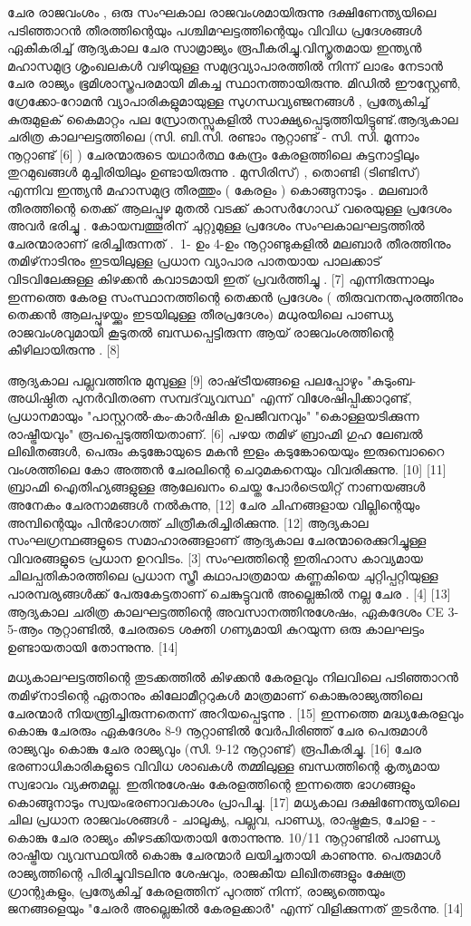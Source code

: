 \documentclass[a4paper,12pt,oneside,final]{article}
\begin{document}
ചേര രാജവംശം , ഒരു സംഘകാല രാജവംശമായിരുന്നു ദക്ഷിണേന്ത്യയിലെ പടിഞ്ഞാറൻ തീരത്തിന്റെയും പശ്ചിമഘട്ടത്തിന്റെയും വിവിധ പ്രദേശങ്ങൾ ഏകീകരിച്ച് ആദ്യകാല ചേര സാമ്രാജ്യം രൂപീകരിച്ചു.വിസ്തൃതമായ ഇന്ത്യൻ മഹാസമുദ്ര ശൃംഖലകൾ വഴിയുള്ള സമുദ്രവ്യാപാരത്തിൽ നിന്ന് ലാഭം നേടാൻ ചേര രാജ്യം ഭൂമിശാസ്ത്രപരമായി മികച്ച സ്ഥാനത്തായിരുന്നു. മിഡിൽ ഈസ്റ്റേൺ, ഗ്രേക്കോ-റോമൻ വ്യാപാരികളുമായുള്ള സുഗന്ധവ്യഞ്ജനങ്ങൾ , പ്രത്യേകിച്ച് കുരുമുളക് കൈമാറ്റം പല സ്രോതസ്സുകളിൽ സാക്ഷ്യപ്പെടുത്തിയിട്ടുണ്ട്.ആദ്യകാല ചരിത്ര കാലഘട്ടത്തിലെ (സി. ബി.സി. രണ്ടാം നൂറ്റാണ്ട് - സി. സി. മൂന്നാം നൂറ്റാണ്ട് [6] ) ചേരന്മാരുടെ യഥാർത്ഥ കേന്ദ്രം കേരളത്തിലെ കുട്ടനാട്ടിലും തുറമുഖങ്ങൾ മുച്ചിരിയിലും ഉണ്ടായിരുന്നു . മുസിരിസ്) , തൊണ്ടി (ടിണ്ടിസ്) എന്നിവ ഇന്ത്യൻ മഹാസമുദ്ര തീരത്തും ( കേരളം ) കൊങ്ങുനാടും . മലബാർ തീരത്തിന്റെ തെക്ക് ആലപ്പുഴ മുതൽ വടക്ക് കാസർഗോഡ് വരെയുള്ള പ്രദേശം അവർ ഭരിച്ചു . കോയമ്പത്തൂരിന് ചുറ്റുമുള്ള പ്രദേശം സംഘകാലഘട്ടത്തിൽ ചേരന്മാരാണ് ഭരിച്ചിരുന്നത് .  1- ഉം 4-ഉം നൂറ്റാണ്ടുകളിൽ മലബാർ തീരത്തിനും തമിഴ്‌നാടിനും ഇടയിലുള്ള പ്രധാന വ്യാപാര പാതയായ പാലക്കാട് വിടവിലേക്കുള്ള കിഴക്കൻ കവാടമായി ഇത് പ്രവർത്തിച്ചു . [7] എന്നിരുന്നാലും ഇന്നത്തെ കേരള സംസ്ഥാനത്തിന്റെ തെക്കൻ പ്രദേശം ( തിരുവനന്തപുരത്തിനും തെക്കൻ ആലപ്പുഴയ്ക്കും ഇടയിലുള്ള തീരപ്രദേശം) മധുരയിലെ പാണ്ഡ്യ രാജവംശവുമായി കൂടുതൽ ബന്ധപ്പെട്ടിരുന്ന ആയ് രാജവംശത്തിന്റെ കീഴിലായിരുന്നു . [8]

ആദ്യകാല പല്ലവത്തിനു മുമ്പുള്ള [9] രാഷ്‌ട്രീയങ്ങളെ പലപ്പോഴും "കുടുംബ-അധിഷ്ഠിത പുനർവിതരണ സമ്പദ്‌വ്യവസ്ഥ" എന്ന് വിശേഷിപ്പിക്കാറുണ്ട്, പ്രധാനമായും "പാസ്റ്ററൽ-കം-കാർഷിക ഉപജീവനവും" "കൊള്ളയടിക്കുന്ന രാഷ്ട്രീയവും" രൂപപ്പെടുത്തിയതാണ്. [6] പഴയ തമിഴ് ബ്രാഹ്മി ഗുഹ ലേബൽ ലിഖിതങ്ങൾ, പെരും കടുങ്കോയുടെ മകൻ ഇളം കടുങ്കോയെയും ഇരുമ്പൊറൈ വംശത്തിലെ കോ അത്തൻ ചേരലിന്റെ ചെറുമകനെയും വിവരിക്കുന്നു. [10] [11] ബ്രാഹ്മി ഐതിഹ്യങ്ങളുള്ള ആലേഖനം ചെയ്ത പോർട്രെയിറ്റ് നാണയങ്ങൾ അനേകം ചേരനാമങ്ങൾ നൽകുന്നു, [12] ചേര ചിഹ്നങ്ങളായ വില്ലിന്റെയും അമ്പിന്റെയും പിൻഭാഗത്ത് ചിത്രീകരിച്ചിരിക്കുന്നു. [12] ആദ്യകാല സംഘഗ്രന്ഥങ്ങളുടെ സമാഹാരങ്ങളാണ് ആദ്യകാല ചേരന്മാരെക്കുറിച്ചുള്ള വിവരങ്ങളുടെ പ്രധാന ഉറവിടം. [3] സംഘത്തിന്റെ ഇതിഹാസ കാവ്യമായ ചിലപ്പതികാരത്തിലെ പ്രധാന സ്ത്രീ കഥാപാത്രമായ കണ്ണകിയെ ചുറ്റിപ്പറ്റിയുള്ള പാരമ്പര്യങ്ങൾക്ക് പേരുകേട്ടതാണ് ചെങ്കുട്ടുവൻ അല്ലെങ്കിൽ നല്ല ചേര . [4] [13] ആദ്യകാല ചരിത്ര കാലഘട്ടത്തിന്റെ അവസാനത്തിനുശേഷം, ഏകദേശം CE 3-5-ആം നൂറ്റാണ്ടിൽ, ചേരരുടെ ശക്തി ഗണ്യമായി കുറയുന്ന ഒരു കാലഘട്ടം ഉണ്ടായതായി തോന്നുന്നു. [14]

മധ്യകാലഘട്ടത്തിന്റെ തുടക്കത്തിൽ കിഴക്കൻ കേരളവും നിലവിലെ പടിഞ്ഞാറൻ തമിഴ്‌നാടിന്റെ ഏതാനും കിലോമീറ്ററുകൾ മാത്രമാണ് കൊങ്കുരാജ്യത്തിലെ ചേരന്മാർ നിയന്ത്രിച്ചിരുന്നതെന്ന് അറിയപ്പെടുന്നു . [15] ഇന്നത്തെ മദ്ധ്യകേരളവും കൊങ്കു ചേരരും ഏകദേശം 8-9 നൂറ്റാണ്ടിൽ വേർപിരിഞ്ഞ് ചേര പെരുമാൾ രാജ്യവും കൊങ്കു ചേര രാജ്യവും (സി. 9-12 നൂറ്റാണ്ട്) രൂപീകരിച്ചു. [16] ചേര ഭരണാധികാരികളുടെ വിവിധ ശാഖകൾ തമ്മിലുള്ള ബന്ധത്തിന്റെ കൃത്യമായ സ്വഭാവം വ്യക്തമല്ല. ഇതിനുശേഷം കേരളത്തിന്റെ ഇന്നത്തെ ഭാഗങ്ങളും കൊങ്ങുനാടും സ്വയംഭരണാവകാശം പ്രാപിച്ചു. [17] മധ്യകാല ദക്ഷിണേന്ത്യയിലെ ചില പ്രധാന രാജവംശങ്ങൾ - ചാലൂക്യ, പല്ലവ, പാണ്ഡ്യ, രാഷ്ട്രകൂട, ചോള - - കൊങ്കു ചേര രാജ്യം കീഴടക്കിയതായി തോന്നുന്നു. 10/11 നൂറ്റാണ്ടിൽ പാണ്ഡ്യ രാഷ്ട്രീയ വ്യവസ്ഥയിൽ കൊങ്കു ചേരന്മാർ ലയിച്ചതായി കാണുന്നു. പെരുമാൾ രാജ്യത്തിന്റെ പിരിച്ചുവിടലിനു ശേഷവും, രാജകീയ ലിഖിതങ്ങളും ക്ഷേത്ര ഗ്രാന്റുകളും, പ്രത്യേകിച്ച് കേരളത്തിന് പുറത്ത് നിന്ന്, രാജ്യത്തെയും ജനങ്ങളെയും "ചേരർ അല്ലെങ്കിൽ കേരളക്കാർ" എന്ന് വിളിക്കുന്നത് തുടർന്നു. [14]
\end{document}

